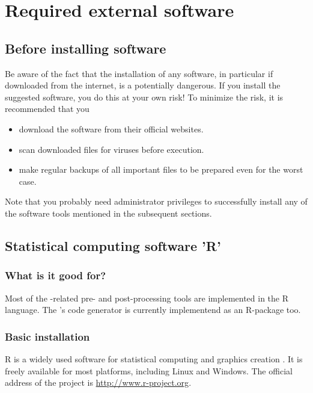 
\chapter{Required external software} \label{chap:extSoft}
\renewcommand{\tabdir}{chapters/extSoft/extSoft/tab}
\renewcommand{\figdir}{chapters/extSoft/extSoft/fig}

\section{Before installing software} \label{sec:extSoft:generalNotes}
Be aware of the fact that the installation of any software, in particular if downloaded from the internet, is a potentially dangerous. If you install the suggested software, you do this at your own risk! To minimize the risk, it is recommended that you
\begin{itemize}
  \item download the software from their official websites.
  \item scan downloaded files for viruses before execution.
  \item make regular backups of all important files to be prepared even for the worst case.
\end{itemize}

Note that you probably need administrator privileges to successfully install any of the software tools mentioned in the subsequent sections.

\section{Statistical computing software 'R'} \label{sec:extSoft:R}

\subsection{What is it good for?} \label{sec:extSoft:R:why}
Most of the -related pre- and post-processing tools are implemented in the R language. The 's code generator is currently implementend as an R-package too.

\subsection{Basic installation} \label{sec:extSoft:R:basic}
R is a widely used software for statistical computing and graphics creation \citep{R}. It is freely available for most platforms, including Linux and Windows. The official address of the project is \url{http://www.r-project.org}.

